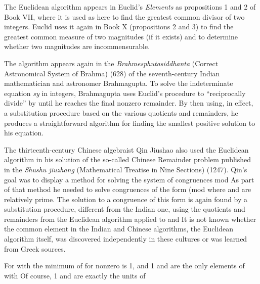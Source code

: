 \documentclass[11pt,oneside]{article}
\begin{document}
\BookNarrativetrue

\begin{BookBody}


\noindent The Euclidean algorithm appears in Euclid’s \textit{Elements} as propositions 1 and 2 of Book VII, where it is used as here to find the greatest common divisor of two integers. Euclid uses it again in Book X (propositions 2 and 3) to find the greatest common measure of two magnitudes (if it exists) and to determine whether two magnitudes are incommensurable.

\noindent The algorithm appears again in the\textit{ Brahmes}\textit{phutasiddhanta} (Correct Astronomical System of Brahma) (628) of the seventh-century Indian mathematician and astronomer Brahmagupta. To solve the indeterminate equation  \textit{sy} in integers, Brahmagupta uses Euclid’s procedure to “reciprocally divide”  by  until he reaches the final nonzero remainder. By then using, in effect, a substitution procedure based on the various quotients and remainders, he produces a straightforward algorithm for finding the smallest positive solution to his equation.

The thirteenth-century Chinese algebraist Qin Jiushao also used the Euclidean algorithm in his solution of the so-called Chinese Remainder problem published in the\textit{ Shushu jiuzhang} (Mathematical Treatise in Nine Sections) (1247). Qin’s goal was to display a method for solving the system of congruences mod  As part of that method he needed to solve congruences of the form  (mod  where  and  are relatively prime. The solution to a congruence of this form is again found by a substitution procedure, different from the Indian one, using the quotients and remainders from the Euclidean algorithm applied to  and  It is not known whether the common element in the Indian and Chinese algorithms, the Euclidean algorithm itself, was discovered independently in these cultures or was learned from Greek sources.

 For  with  the minimum of  for nonzero  is 1, and 1 and  are the only elements of  with  Of course, 1 and  are exactly the units of \BookEnd{\blacktriangle}


\end{BookBody}
\end{document}
